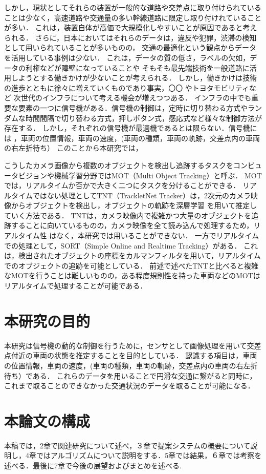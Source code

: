 しかし，現状としてそれらの装置が一般的な道路や交差点に取り付けられていることは少なく，高速道路や交通量の多い幹線道路に限定し取り付けれていることが多い．
これは，装置自体が高価で大規模化しやすいことが原因であると考えられる．
さらに，日本においてはそれらのデータは，違反や犯罪，渋滞の検知として用いられていることが多いものの，
交通の最適化という観点からデータを活用している事例は少ない．
これは，データの質の低さ，ラベルの欠如，データの利権などが障壁になっていることや
そもそも最先端技術を一般道路に活用しようとする働きかけが少ないことが考えられる．
しかし，働きかけは技術の進歩とともに徐々に増えていくものであり事実，〇〇 %
やトヨタモビリティなど
次世代のインフラについて考える機会が増えつつある．
インフラの中でも重要な要素の一つに信号機がある．信号機の制御は，定時に切り替わる方式やランダムな時間間隔で切り替わる方式，押しボタン式，感応式など様々な制御方法が存在する．
しかし，それぞれの信号機が最適機であるとは限らない．信号機には
，車両の位置情報，車両の速度，(車両の種類，車両の軌跡，交差点内の車両の右左折待ち）
このことから本研究では，

こうしたカメラ画像から複数のオブジェクトを検出し追跡するタスクをコンピュータビジョンや機械学習分野ではMOT（Multi Object Tracking）と呼ぶ．
MOTでは，リアルタイムか否かで大きく二つにタスクを分けることができる．
リアルタイムではない処理としてTNT（TrackletNet Tracker）は，2次元のカメラ映像からオブジェクトを検出し，オブジェクトの軌跡を深層学習
を用いて推定していく方法である．\cite{wang2019exploit} \cite{tang2018single} TNTは，カメラ映像内で複雑かつ大量のオブジェクトを追跡することに向いているものの，カメラ映像を全て読み込んで処理するため，リアルタイム性
はなく，本研究では用いることができない．
一方でリアルタイムでの処理として，SORT（Simple Online and Realtime Tracking）がある．\cite{bewley2016simple} \cite{wojke2017simple}
これは，検出されたオブジェクトの座標をカルマンフィルタ\cite{kalman1960new}を用いて，リアルタイムでのオブジェクトの追跡を可能としている．
前述で述べたTNTと比べると複雑なMOTを行うことは難しいものの，ある程度規則性を持った車両などのMOTはリアルタイムで処理することが可能である．

\section{本研究の目的}
本研究は信号機の動的な制御を行うために，センサとして画像処理を用いて交差点付近の車両の状態を推定することを目的としている．
認識する項目は，車両の位置情報，車両の速度，(車両の種類，車両の軌跡，交差点内の車両の右左折待ち）である．%
これらのデータを用いることで円滑な交通に繋がると同時に，これまで取ることのできなかった交通状況のデータを取ることが可能になる．

\section{本論文の構成}
本稿では，2章で関連研究について述べ，３章で提案システムの概要について説明し，4章ではアルゴリズムについて説明をする．5章では結果，６章では考察を述べる．最後に7章で今後の展望およびまとめを述べる.


\newpage
